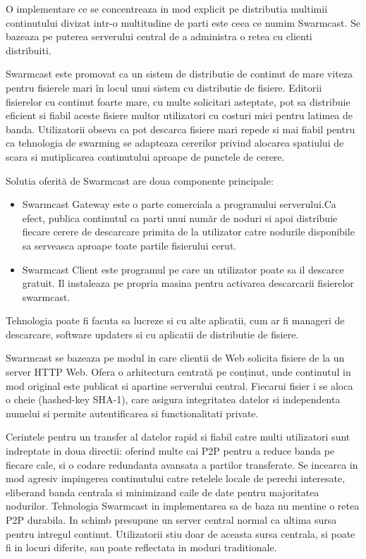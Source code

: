 O implementare ce se concentreaza in mod explicit pe distributia multimii
continutului divizat intr-o multitudine de parti este ceea ce numim Swarmcast.
Se bazeaza pe puterea serverului central de a administra o retea cu clienti
distribuiti.

Swarmcast este promovat ca un sistem de distributie de continut de mare viteza
pentru fisierele mari în locul unui sistem cu distributie de fisiere. Editorii
fisierelor cu continut foarte mare, cu multe solicitari asteptate, pot sa
distribuie eficient si fiabil aceste fisiere multor utilizatori cu costuri
mici pentru latimea de banda. Utilizatorii obseva ca pot descarca fisiere mari
repede si mai fiabil pentru ca tehnologia de swarming se adapteaza cererilor
privind alocarea spatiului de scara si mutiplicarea continutului aproape de
punctele de cerere.

Solutia oferită de Swarmcast are doua componente principale:

\begin{itemize}
  \item{Swarmcast Gateway este o parte comerciala a programului serverului.Ca
  efect, publica continutul ca parti unui număr de noduri si apoi distribuie
  fiecare cerere de descarcare primita de la utilizator catre nodurile
  disponibile sa serveasca aproape toate partile fisierului cerut.}
  \item{Swarmcast Client este programul pe care un utilizator poate sa il
  descarce gratuit. Il instaleaza pe propria masina pentru activarea
  descarcarii fisierelor swarmcast.}
\end{itemize}

Tehnologia poate fi facuta sa lucreze si cu alte aplicatii, cum ar fi manageri
de descarcare, software updaters si cu aplicatii de distributie de fisiere.

Swarmcast se bazeaza pe modul in care clientii de Web solicita fisiere de la
un server HTTP Web. Ofera o arhitectura centrată pe conținut, unde continutul
in mod original este publicat si apartine serverului central. Fiecarui fisier
i se aloca o cheie (hashed-key SHA-1), care asigura integritatea datelor si
independenta numelui si permite autentificarea si functionalitati private.

Cerintele pentru un transfer al datelor rapid si fiabil catre multi
utilizatori sunt indreptate in doua directii: oferind multe cai P2P pentru a
reduce banda pe fiecare cale, si o codare redundanta avansata a partilor
transferate. Se incearca in mod agresiv impingerea continutului catre retelele
locale de perechi interesate, eliberand banda centrala si minimizand caile de
date pentru majoritatea nodurilor. Tehnologia Swarmcast in implementarea sa de
baza nu mentine o retea P2P durabila. In schimb presupune un server central
normal ca ultima sursa pentru intregul continut. Utilizatorii stiu doar de
aceasta sursa centrala, si poate fi in locuri diferite, sau poate reflectata
in moduri traditionale.

